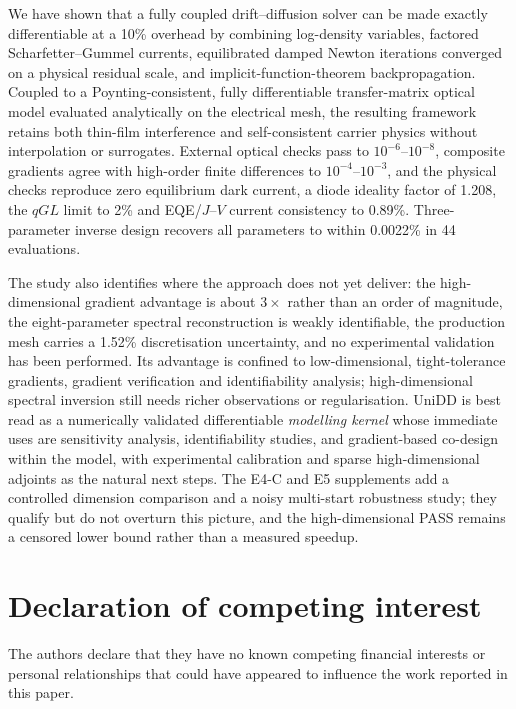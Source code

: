 \documentclass[preprint,12pt]{elsarticle}
\begin{document}
We have shown that a fully coupled drift--diffusion solver can be made
exactly differentiable at a 10\% overhead by combining log-density variables,
factored Scharfetter--Gummel currents, equilibrated damped Newton iterations
converged on a physical residual scale, and implicit-function-theorem
backpropagation. Coupled to a Poynting-consistent, fully differentiable
transfer-matrix optical model evaluated analytically on the electrical mesh,
the resulting framework retains both thin-film interference and
self-consistent carrier physics without interpolation or surrogates.
External optical checks pass to $10^{-6}$--$10^{-8}$, composite gradients
agree with high-order finite differences to $10^{-4}$--$10^{-3}$, and the
physical checks reproduce zero equilibrium dark current, a diode ideality
factor of 1.208, the $qGL$ limit to 2\% and EQE/$J$--$V$ current consistency
to 0.89\%. Three-parameter inverse design recovers all parameters to within
0.0022\% in 44 evaluations.

The study also identifies where the approach does not yet deliver: the high-dimensional gradient advantage is about $3\times$ rather
than an order of magnitude, the eight-parameter spectral reconstruction is
weakly identifiable, the production mesh carries a 1.52\% discretisation
uncertainty, and no experimental validation has been performed. Its advantage is confined to low-dimensional, tight-tolerance gradients,
gradient verification and identifiability analysis; high-dimensional
spectral inversion still needs richer observations or regularisation.
UniDD is best read as a numerically validated differentiable
\emph{modelling kernel} whose
immediate uses are sensitivity analysis, identifiability studies, and
gradient-based co-design within the model, with experimental calibration and
sparse high-dimensional adjoints as the natural next steps. The E4-C and E5
supplements add a controlled dimension comparison and a noisy multi-start
robustness study; they qualify but do not overturn this picture, and the
high-dimensional PASS remains a censored lower bound rather than a measured
speedup.

\section*{Declaration of competing interest}
The authors declare that they have no known competing financial interests or
personal relationships that could have appeared to influence the work
reported in this paper.
\end{document}
